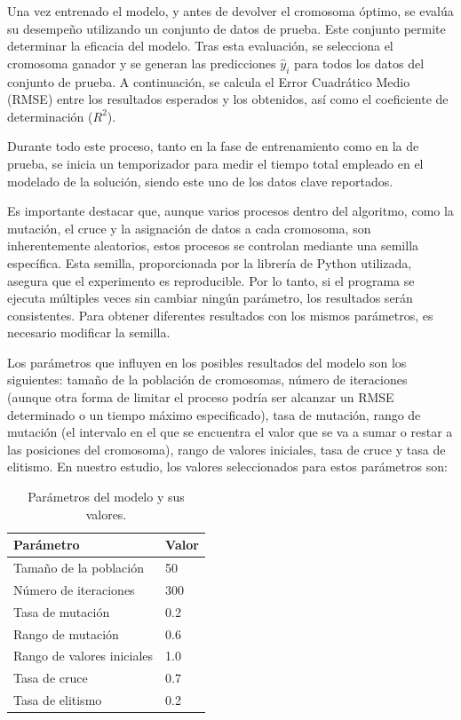 \documentclass[conference,a4paper]{IEEEtran}
\begin{document}
Una vez entrenado el modelo, y antes de devolver el cromosoma óptimo, se evalúa su desempeño utilizando un conjunto de datos de prueba. Este conjunto permite determinar la eficacia del modelo. Tras esta evaluación, se selecciona el cromosoma ganador y se generan las predicciones \(\hat{y}_i\) para todos los datos del conjunto de prueba. A continuación, se calcula el Error Cuadrático Medio (RMSE) entre los resultados esperados y los obtenidos, así como el coeficiente de determinación (\(R^2\)).

Durante todo este proceso, tanto en la fase de entrenamiento como en la de prueba, se inicia un temporizador para medir el tiempo total empleado en el modelado de la solución, siendo este uno de los datos clave reportados.

Es importante destacar que, aunque varios procesos dentro del algoritmo, como la mutación, el cruce y la asignación de datos a cada cromosoma, son inherentemente aleatorios, estos procesos se controlan mediante una semilla específica. Esta semilla, proporcionada por la librería de Python utilizada, asegura que el experimento es reproducible. Por lo tanto, si el programa se ejecuta múltiples veces sin cambiar ningún parámetro, los resultados serán consistentes. Para obtener diferentes resultados con los mismos parámetros, es necesario modificar la semilla.

Los parámetros que influyen en los posibles resultados del modelo son los siguientes: tamaño de la población de cromosomas, número de iteraciones (aunque otra forma de limitar el proceso podría ser alcanzar un RMSE determinado o un tiempo máximo especificado), tasa de mutación, rango de mutación (el intervalo en el que se encuentra el valor que se va a sumar o restar a las posiciones del cromosoma), rango de valores iniciales, tasa de cruce y tasa de elitismo. En nuestro estudio, los valores seleccionados para estos parámetros son:

\begin{table}[h]
\centering
\caption{Parámetros del modelo y sus valores.}
\label{tab:parametros}
\begin{tabular}{ll}
\toprule
\textbf{Parámetro} & \textbf{Valor} \\
\midrule
Tamaño de la población         & 50 \\
Número de iteraciones          & 300 \\
Tasa de mutación               & 0.2 \\
Rango de mutación              & 0.6 \\
Rango de valores iniciales     & 1.0 \\
Tasa de cruce                  & 0.7 \\
Tasa de elitismo               & 0.2 \\
\bottomrule
\end{tabular}
\end{table}
\end{document}
